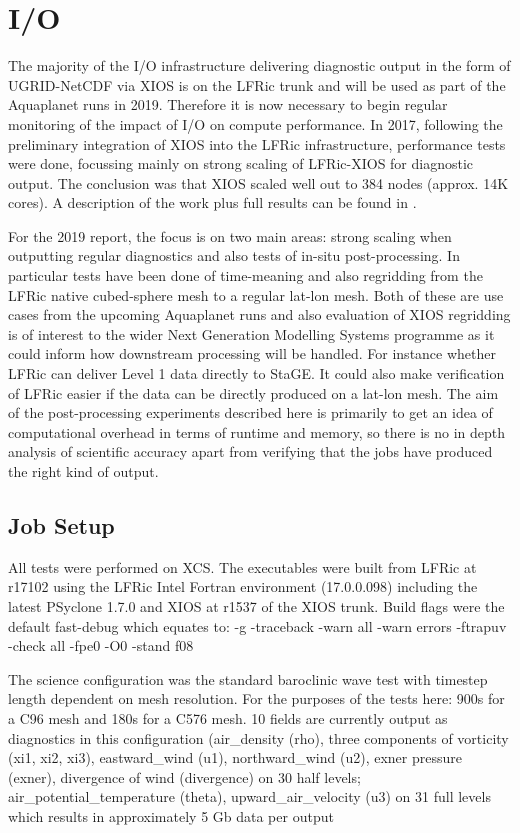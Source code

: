 \section{I/O}
The majority of the I/O infrastructure delivering diagnostic output in the form of UGRID-NetCDF via XIOS is on the LFRic trunk
and will be used as part of the Aquaplanet runs in 2019. Therefore it is now necessary to begin regular monitoring of the impact
of I/O on compute performance. In 2017, following the preliminary integration of XIOS into the LFRic infrastructure, performance
tests were done, focussing mainly on strong scaling of LFRic-XIOS for diagnostic output. The conclusion was that XIOS scaled well
out to 384 nodes (approx. 14K cores). A description of the work plus full results can be found in \cite{Adams2018}. 

For the 2019 report, the focus is on two main areas: strong scaling when outputting regular
diagnostics and also tests of in-situ post-processing. In particular tests have been done of time-meaning and also regridding 
from the LFRic native cubed-sphere mesh to a regular lat-lon mesh. Both of these are use cases from the upcoming Aquaplanet
runs and also evaluation of XIOS regridding is of interest to the wider Next Generation Modelling Systems programme as it
could inform how downstream processing will be handled. For instance whether LFRic can deliver Level 1 data directly to StaGE.
It could also make verification of LFRic easier if the data can be directly produced on a lat-lon mesh. The aim of the post-processing
experiments described here is primarily to get an idea of computational overhead in terms of runtime and memory, 
so there is no in depth analysis of scientific accuracy apart from verifying that the jobs have produced the right kind of output. 

\subsection{Job Setup}
All tests were performed on XCS. The executables were built from LFRic at r17102 using the LFRic Intel Fortran environment (17.0.0.098) 
including the latest PSyclone 1.7.0 and XIOS at r1537 of the XIOS trunk. Build flags were the default fast-debug which equates to:
-g -traceback -warn all -warn errors -ftrapuv -check all -fpe0 -O0 -stand f08

The science configuration was the standard baroclinic wave test with timestep length dependent on mesh resolution. 
For the purposes of the tests here: 900s for a C96 mesh and 180s for a C576 mesh.
10 fields are currently output as diagnostics in this configuration (air\_density (rho), three components of vorticity (xi1, xi2, xi3), eastward\_wind (u1), 
northward\_wind (u2), exner pressure (exner), divergence
of wind (divergence) on 30 half levels; air\_potential\_temperature (theta), upward\_air\_velocity (u3) on 31 full levels
which results in approximately 5 Gb data per output

